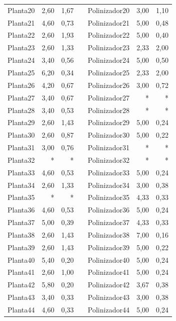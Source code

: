 \begin{table}[htbp]
\begin{tabular}{lrrrlrr}
    Planta20 & 2,60 & 1,67 &      & Polinizador20 & 3,00 & 1,10 \\
    Planta21 & 4,60 & 0,73 &      & Polinizador21 & 5,00 & 0,48 \\
    Planta22 & 2,60 & 1,93 &      & Polinizador22 & 5,00 & 0,40 \\
    Planta23 & 2,60 & 1,33 &      & Polinizador23 & 2,33 & 2,00 \\
    Planta24 & 3,40 & 0,56 &      & Polinizador24 & 5,00 & 0,50 \\
    Planta25 & 6,20 & 0,34 &      & Polinizador25 & 2,33 & 2,00 \\
    Planta26 & 4,20 & 0,67 &      & Polinizador26 & 3,00 & 0,72 \\
    Planta27 & 3,40 & 0,67 &      & Polinizador27 & *    & * \\
    Planta28 & 3,40 & 0,53 &      & Polinizador28 & *    & * \\
    Planta29 & 2,60 & 1,43 &      & Polinizador29 & 5,00 & 0,24 \\
    Planta30 & 2,60 & 0,87 &      & Polinizador30 & 5,00 & 0,22 \\
    Planta31 & 3,00 & 0,76 &      & Polinizador31 & *    & * \\
    Planta32 & *    & *    &      & Polinizador32 & *    & * \\
    Planta33 & 4,60 & 0,53 &      & Polinizador33 & 5,00 & 0,24 \\
    Planta34 & 2,60 & 1,33 &      & Polinizador34 & 3,00 & 0,38 \\
    Planta35 & *    & *    &      & Polinizador35 & 4,33 & 0,33 \\
    Planta36 & 4,60 & 0,53 &      & Polinizador36 & 5,00 & 0,24 \\
    Planta37 & 5,00 & 0,39 &      & Polinizador37 & 4,33 & 0,33 \\
    Planta38 & 2,60 & 1,43 &      & Polinizador38 & 7,00 & 0,16 \\
    Planta39 & 2,60 & 1,43 &      & Polinizador39 & 5,00 & 0,22 \\
    Planta40 & 5,40 & 0,20 &      & Polinizador40 & 5,00 & 0,24 \\
    Planta41 & 2,60 & 1,00 &      & Polinizador41 & 5,00 & 0,24 \\
    Planta42 & 5,80 & 0,20 &      & Polinizador42 & 3,67 & 0,38 \\
    Planta43 & 3,40 & 0,33 &      & Polinizador43 & 3,00 & 0,38 \\
    Planta44 & 4,60 & 0,33 &      & Polinizador44 & 5,00 & 0,24 \\

\end{tabular}
\end{table}
